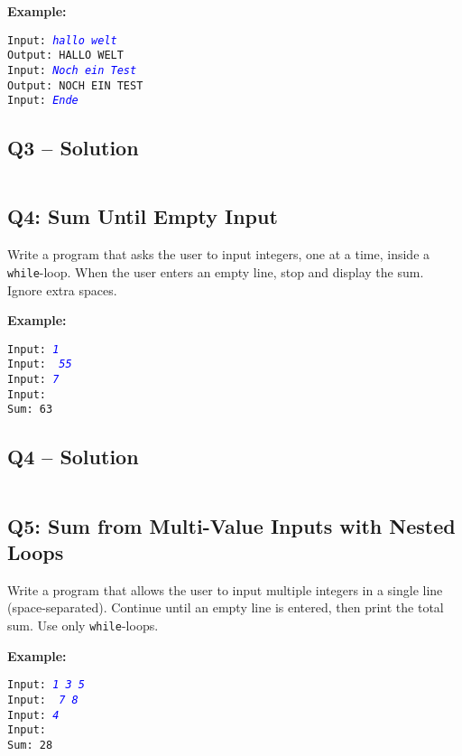 \documentclass[a4paper,11pt]{article}
\begin{document}
\textbf{Example:}
\begin{flushleft}
	\texttt{Input: \textcolor{blue}{\textit{hallo welt}}}\\
	\texttt{Output: HALLO WELT}\\
	\texttt{Input: \textcolor{blue}{\textit{Noch ein Test}}}\\
	\texttt{Output: NOCH EIN TEST}\\
	\texttt{Input: \textcolor{blue}{\textit{Ende}}}
\end{flushleft}


\subsection*{Q3 – Solution}
\inputminted{python}{Files/5/3.py}

\subsection*{Q4: Sum Until Empty Input}
Write a program that asks the user to input integers, one at a time, inside a \texttt{while}-loop. When the user enters an empty line, stop and display the sum. Ignore extra spaces.

\textbf{Example:}
\begin{flushleft}
	\texttt{Input: \textcolor{blue}{\textit{1}}}\\
	\texttt{Input: \textcolor{blue}{\textit{   55}}}\\
	\texttt{Input: \textcolor{blue}{\textit{7}}}\\
	\texttt{Input: \textcolor{blue}{\textit{}}}\\
	\texttt{Sum: 63}
\end{flushleft}

\subsection*{Q4 – Solution}
\inputminted{python}{Files/5/4.py}

\subsection*{Q5: Sum from Multi-Value Inputs with Nested Loops}
Write a program that allows the user to input multiple integers in a single line (space-separated). Continue until an empty line is entered, then print the total sum. Use only \texttt{while}-loops.

\textbf{Example:}
\begin{flushleft}
	\texttt{Input: \textcolor{blue}{\textit{1 3 5}}}\\
	\texttt{Input: \textcolor{blue}{\textit{   7   8}}}\\
	\texttt{Input: \textcolor{blue}{\textit{4}}}\\
	\texttt{Input: \textcolor{blue}{\textit{}}}\\
	\texttt{Sum: 28}
\end{flushleft}
\end{document}
